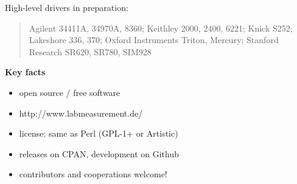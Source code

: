 \documentclass[portrait]{a0poster}
\newcommand{\heading}[1]{
  {\color{heading}\boldmath\textbf{\huge #1}}\\[\medskipamount]
}
\begin{document}
{\begin{minipage}[t][\columnheighta-2\fboxsep-2\fboxrule][t]
\begin{minipage}{\textwidth}
{High-level drivers in preparation:
\begin{quote}
 Agilent 34411A, 34970A, 8360;
 Keithley 2000, 2400, 6221;
 Knick S252;
 Lakeshore 336, 370;
 Oxford Instruments Triton, Mercury;
 Stanford Research SR620, SR780, SIM928
\end{quote}
\renewcommand{\baselinestretch}{1}}
 


\vspace*{2cm}
\heading{Key facts}
\vspace*{-2cm}
\begin{itemize}
 \item
 open source / free software\\[-5cm]
 \item 
 http://www.labmeasurement.de/
 \hfill{}
 \item
 license: same as Perl (GPL-1+ or Artistic)
 \item
 releases on CPAN, development on Github
 \item
 contributors and cooperations welcome!
\end{itemize}






%
%
%
\end{minipage}
%
\end{minipage}}
%
%
%
%
\end{document}
